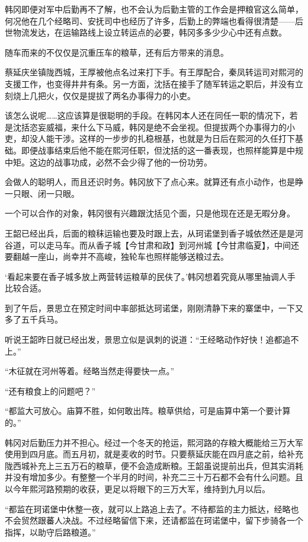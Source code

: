 韩冈即便对军中后勤再不了解，也不会认为后勤主管的工作会是押粮官这么简单，何况他在几个经略司、安抚司中也经历了许多，后勤上的弊端也看得很清楚——后世物流发达，在运输路线上设立转运点的必要，韩冈多多少少心中还有点数。

随车而来的不仅仅是沉重压车的粮草，还有后方带来的消息。

蔡延庆坐镇陇西城，王厚被他点名过来打下手。有王厚配合，秦凤转运司对熙河的支援工作，也变得井井有条。另一方面，沈括在接手了随军转运之职后，并没有立刻烧上几把火，仅仅是提拔了两名办事得力的小吏。

该怎么说呢……这应该算是很聪明的手段。在韩冈本人还在同任一职的情况下，若是沈括恣妄威福，来什么下马威，韩冈是绝不会坐视。但提拔两个办事得力的小吏，却没人能干涉。这样的一步步的扎稳根基，也就是为日后在熙河的久任打下基础。即便战事结束后他不能在熙河任职，但沈括的这一番表现，也照样能算是中规中矩。这边的战事功成，必然不会少得了他的一份功劳。

会做人的聪明人，而且还识时务。韩冈放下了点心来。就算还有点小动作，也是睁一只眼、闭一只眼。

一个可以合作的对象，韩冈很有兴趣跟沈括见个面，只是他现在还是无暇分身。

王韶已经出兵，后面的粮秣运输也要及时跟上去，从珂诺堡到香子城依然还是是河谷道，可以走马车。而从香子城【今甘肃和政】到河州城【今甘肃临夏】，中间还要翻越一座山，尚幸并不高峻，独轮车也照样能够送粮过去。

‘看起来要在香子城多放上两营转运粮草的民伕了。’韩冈想着究竟从哪里抽调人手比较合适。

到了午后，景思立在预定时间中率部抵达珂诺堡，刚刚清静下来的寨堡中，一下又多了五千兵马。

听说王韶昨日就已经出发，景思立似是讽刺的说道：“王经略动作好快！追都追不上。”

“木征就在河州等着。经略当然走得要快一点。”

“还有粮食上的问题吧？”

“都监大可放心。庙算不胜，如何敢出阵。粮草供给，可是庙算中第一个要计算的。”

韩冈对后勤压力并不担心。经过一个冬天的抢运，熙河路的存粮大概能给三万大军使用到四月底。而五月初，就是麦收的时节。只要蔡延庆能在四月底之前，给补充陇西城补充上三五万石的粮草，便不会造成断粮。王韶虽说提前出兵，但其实消耗并没有增加多少。有整整一个半月的时间，补充二三十万石都不会有什么问题。且以今年熙河路预期的收获，更足以将眼下的三万大军，维持到九月以后。

“都监在珂诺堡中休整一夜，就可以上路追上去了。不待都监的主力抵达，经略也不会贸然跟蕃人决战。不过经略留信下来，还请都监在珂诺堡中，留下步骑各一个指挥，以助守后路粮道。”

